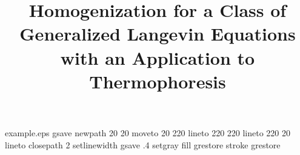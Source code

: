%
%
%
%
%
\begin{filecontents*}{example.eps}
gsave
newpath
  20 20 moveto
  20 220 lineto
  220 220 lineto
  220 20 lineto
closepath
2 setlinewidth
gsave
  .4 setgray fill
grestore
stroke
grestore
\end{filecontents*}
%
\documentclass[onecollarge]{svjour2}       %
%
\smartqed  %
%
\usepackage{graphicx}
%
\usepackage{amssymb}
\usepackage{amsmath}
\let\proof\relax\let\endproof\relax
\usepackage{amsthm}
\usepackage{appendix}
\usepackage[numbers]{natbib}
\usepackage{color}



\newcommand{\RR}{\mathbb{R}}      %
\newcommand{\QQ}{\mathbb{Q}}      %
\newcommand{\CC}{\mathbb{C}}      %
\newcommand{\NN}{\mathbb{N}}      %
\newcommand{\ZZ}{\mathbb{Z}}      %
\newcommand{\vecc}{\boldsymbol}
\newcommand*\widefbox[1]{\fbox{\hspace{2em}#1\hspace{2em}}}
\newcommand{\JW}[1]{{\color{red} #1}}



\newtheorem{ass}{Assumption}
%
%


\title{Homogenization for a Class of Generalized Langevin Equations with an Application to Thermophoresis
}

